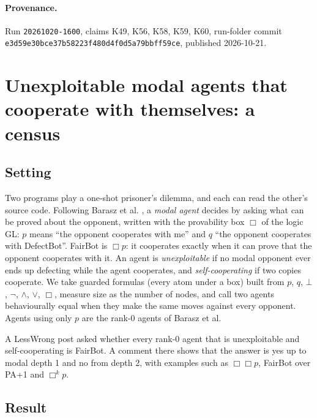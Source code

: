 \documentclass{article}
\begin{document}
\paragraph{Provenance.}
Run \texttt{20261020-1600}, claims K49, K56, K58, K59, K60, run-folder commit \texttt{e3d59e30bce37b58223f480d4f0d5a79bbff59ce}, published 2026-10-21.

\section{Unexploitable modal agents that cooperate with themselves: a census}
\label{sec:only-one-fairbot-census}

\subsection*{Setting}

Two programs play a one-shot prisoner's dilemma, and each can read the other's source code.
Following Barasz et al. \cite{barasz2014robust}, a \emph{modal agent} decides by asking what can be proved
about the opponent, written with the provability box $\Box$ of the logic GL: $p$ means ``the
opponent cooperates with me'' and $q$ ``the opponent cooperates with DefectBot''. FairBot is
$\Box p$: it cooperates exactly when it can prove that the opponent cooperates with it. An agent
is \emph{unexploitable} if no modal opponent ever ends up defecting while the agent cooperates, and
\emph{self-cooperating} if two copies cooperate. We take guarded formulas (every atom under a box)
built from $p$, $q$, $\bot$, $\neg$, $\wedge$, $\vee$, $\Box$, measure size as the number of
nodes, and call two agents behaviourally equal when they make the same moves against every
opponent. Agents using only $p$ are the rank-0 agents of Barasz et al.

A LessWrong post \cite{onlyonefairbot2026} asked whether every rank-0 agent that is unexploitable and
self-cooperating is FairBot. A comment there shows that the answer is yes up to modal depth 1 and
no from depth 2, with examples such as $\Box\Box p$, FairBot over PA+1 and $\Box^k p$.

\subsection*{Result}
\end{document}
